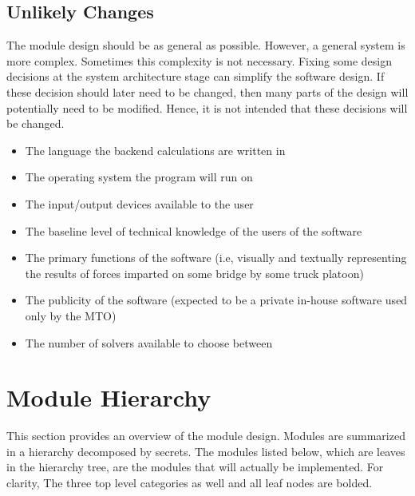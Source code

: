\documentclass[12pt, titlepage]{article}
\begin{document}
\subsection{Unlikely Changes} \label{SecUchange}

The module design should be as general as possible. However, a general system is
more complex. Sometimes this complexity is not necessary. Fixing some design
decisions at the system architecture stage can simplify the software design. If
these decision should later need to be changed, then many parts of the design
will potentially need to be modified. Hence, it is not intended that these
decisions will be changed.

\begin{itemize}
    \item The language the backend calculations are written in
    \item The operating system the program will run on
    \item The input/output devices available to the user
    \item The baseline level of technical knowledge of the users of the software
    \item The primary functions of the software (i.e, visually and textually representing the results of forces imparted on some bridge by some truck platoon)
    \item The publicity of the software (expected to be a private in-house software used only by the MTO)
    \item The number of solvers available to choose between
\end{itemize}

\section{Module Hierarchy} \label{SecMH}

This section provides an overview of the module design. Modules are summarized
in a hierarchy decomposed by secrets. The modules listed
below, which are leaves in the hierarchy tree, are the modules that will
actually be implemented. For clarity, The three top level categories as well and all leaf nodes are bolded.
\end{document}
